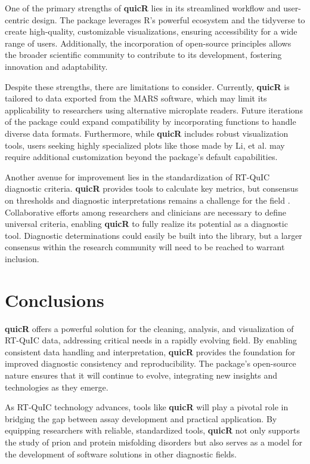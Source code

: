 \documentclass[preprint,12pt,a4paper]{elsarticle}
\begin{document}
        One of the primary strengths of \textbf{quicR} lies in its streamlined workflow and user-centric design. The package leverages R’s powerful ecosystem and the tidyverse \cite{tidyverse2019} to create high-quality, customizable visualizations, ensuring accessibility for a wide range of users. Additionally, the incorporation of open-source principles allows the broader scientific community to contribute to its development, fostering innovation and adaptability.

        Despite these strengths, there are limitations to consider. Currently, \textbf{quicR} is tailored to data exported from the MARS software, which may limit its applicability to researchers using alternative microplate readers. Future iterations of the package could expand compatibility by incorporating functions to handle diverse data formats. Furthermore, while \textbf{quicR} includes robust visualization tools, users seeking highly specialized plots like those made by Li, et al.\cite{Li2025} may require additional customization beyond the package’s default capabilities.

        Another avenue for improvement lies in the standardization of RT-QuIC diagnostic criteria. \textbf{quicR} provides tools to calculate key metrics, but consensus on thresholds and diagnostic interpretations remains a challenge for the field \cite{Rowden2023}. Collaborative efforts among researchers and clinicians are necessary to define universal criteria, enabling \textbf{quicR} to fully realize its potential as a diagnostic tool. Diagnostic determinations could easily be built into the library, but a larger consensus within the research community will need to be reached to warrant inclusion.

    \section{Conclusions} 
        \textbf{quicR} offers a powerful solution for the cleaning, analysis, and visualization of RT-QuIC data, addressing critical needs in a rapidly evolving field. By enabling consistent data handling and interpretation, \textbf{quicR} provides the foundation for improved diagnostic consistency and reproducibility. The package's open-source nature ensures that it will continue to evolve, integrating new insights and technologies as they emerge.

        As RT-QuIC technology advances, tools like \textbf{quicR} will play a pivotal role in bridging the gap between assay development and practical application. By equipping researchers with reliable, standardized tools, \textbf{quicR} not only supports the study of prion and protein misfolding disorders but also serves as a model for the development of software solutions in other diagnostic fields.
\end{document}
